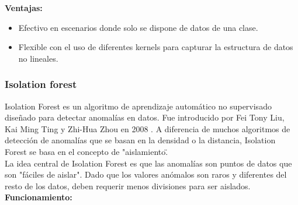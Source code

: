 \textbf{Ventajas:}
\begin{itemize}
    \item Efectivo en escenarios donde solo se dispone de datos de una clase.
    \item Flexible con el uso de diferentes kernels para capturar la estructura de datos no lineales.
\end{itemize}


\subsubsection{Isolation forest}

Isolation Forest es un algoritmo de aprendizaje automático no supervisado diseñado para detectar anomalías en datos. Fue introducido por Fei Tony Liu, Kai Ming Ting y Zhi-Hua Zhou en 2008 \cite{liu2008isolation}. A diferencia de muchos algoritmos de detección de anomalías que se basan en la densidad o la distancia, Isolation Forest se basa en el concepto de "aislamiento\".\\

La idea central de Isolation Forest es que las anomalías son puntos de datos que son "fáciles de aislar". Dado que los valores anómalos son raros y diferentes del resto de los datos, deben requerir menos divisiones para ser aislados. \\

\textbf{Funcionamiento: }

